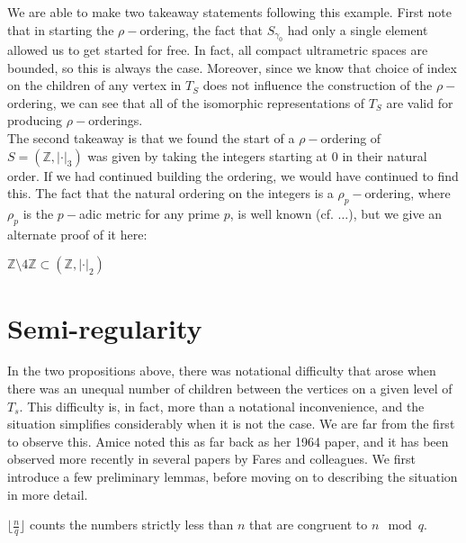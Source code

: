 We are able to make two takeaway statements following this example. First note that in starting the $\rho-$ordering, the fact that $S_{\gamma_0}$ had only a single element allowed us to get started for free. In fact,  all compact ultrametric spaces are bounded, so this is always the case. Moreover, since we know that choice of index on the children of any vertex in $T_S$ does not influence the construction of the $\rho-$ordering, we can see that all of the isomorphic representations of $T_S$ are valid for producing $\rho-$orderings.\\

The second takeaway is that we found the start of a $\rho-$ordering of $S=(\mathbb{Z}, \lvert \cdot \rvert_3)$ was given by taking the integers starting at $0$ in their natural order. If we had continued building the ordering, we would have continued to find this. The fact that the natural ordering on the integers is a $\rho_p-$ordering, where $\rho_p$ is the $p-$adic metric for any prime $p$, is well known (cf. $\ldots$), but we give an alternate proof of it here: 


\begin{example}
$\mathbb{Z} \setminus 4\mathbb{Z} \subset (\mathbb{Z}, \lvert \cdot \rvert_2)$
\end{example}



\section*{Semi-regularity}
In the two propositions above, there was notational difficulty that arose when there was an unequal number of children between the vertices on a given level of $T_s$. This difficulty is, in fact, more than a notational inconvenience, and the situation simplifies considerably when it is not the case. We are far from the first to observe this. Amice noted this as far back as her 1964 paper, and it has been observed more recently in several papers by Fares and colleagues. We first introduce a few preliminary lemmas, before moving on to describing the situation in more detail.

\begin{lemma*}
$\lfloor\frac{n}{q} \rfloor$ counts the numbers strictly less than $n$ that are congruent to $n \mod q$.
\end{lemma*}

